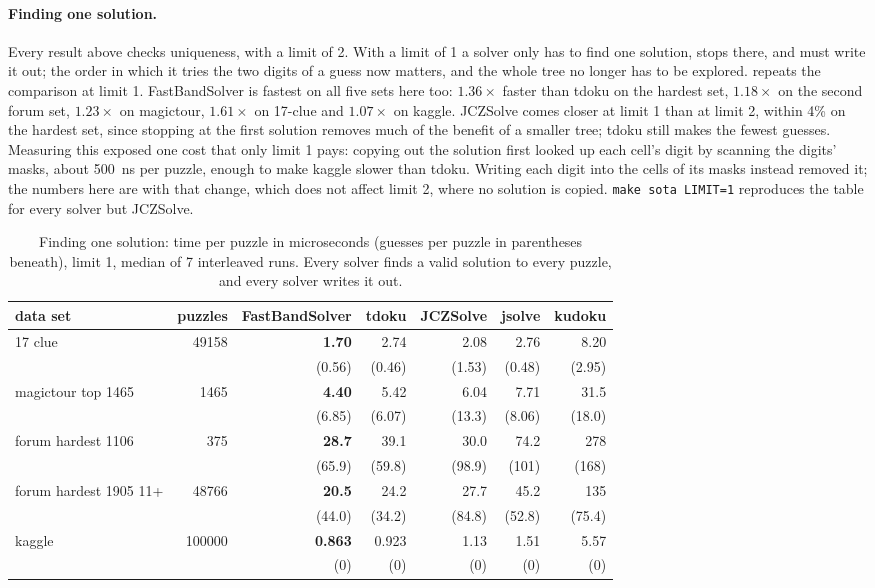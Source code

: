\documentclass[11pt]{article}
\theoremstyle{definition}
\theoremstyle{plain}
\begin{document}
\paragraph{Finding one solution.} Every result above checks uniqueness, with a limit of 2. With a limit of 1 a
solver only has to find one solution, stops there, and must write it out; the order in which it tries the two digits
of a guess now matters, and the whole tree no longer has to be explored.  repeats the comparison at
limit 1. FastBandSolver is fastest on all five sets here too: $1.36\times$ faster than tdoku on the hardest set,
$1.18\times$ on the second forum set, $1.23\times$ on magictour, $1.61\times$ on 17-clue and $1.07\times$ on kaggle.
JCZSolve comes closer at limit 1 than at limit 2, within 4\% on the hardest set, since stopping at the first solution
removes much of the benefit of a smaller tree; tdoku still makes the fewest guesses. Measuring this exposed one cost that
only limit 1 pays: copying out the solution first looked up each cell's digit by scanning the digits' masks, about
\SI{500}{\nano\second} per puzzle, enough to make kaggle slower than tdoku. Writing each digit into the cells of its masks instead
removed it; the numbers here are with that change, which does not affect limit 2, where no solution is copied.
\texttt{make sota LIMIT=1} reproduces the table for every solver but JCZSolve.

\begin{table}[t]
\centering
\caption{Finding one solution: time per puzzle in microseconds (guesses per puzzle in parentheses beneath), limit 1, median of 7
interleaved runs. Every solver finds a valid solution to every puzzle, and every solver writes it out.}
\label{tab:limit1}
\small
\setlength{\tabcolsep}{4pt}
\begin{tabular}{lrrrrrr}
\toprule
data set & puzzles & FastBandSolver & tdoku & JCZSolve & jsolve & kudoku \\
\midrule
17 clue & 49158 & \textbf{1.70} & 2.74 & 2.08 & 2.76 & 8.20 \\
&& (0.56) & (0.46) & (1.53) & (0.48) & (2.95) \\[2pt]
magictour top 1465 & 1465 & \textbf{4.40} & 5.42 & 6.04 & 7.71 & 31.5 \\
&& (6.85) & (6.07) & (13.3) & (8.06) & (18.0) \\[2pt]
forum hardest 1106 & 375 & \textbf{28.7} & 39.1 & 30.0 & 74.2 & 278 \\
&& (65.9) & (59.8) & (98.9) & (101) & (168) \\[2pt]
forum hardest 1905 11+ & 48766 & \textbf{20.5} & 24.2 & 27.7 & 45.2 & 135 \\
&& (44.0) & (34.2) & (84.8) & (52.8) & (75.4) \\[2pt]
kaggle & 100000 & \textbf{0.863} & 0.923 & 1.13 & 1.51 & 5.57 \\
&& (0) & (0) & (0) & (0) & (0) \\[2pt]
\bottomrule
\end{tabular}
\end{table}
\end{document}
